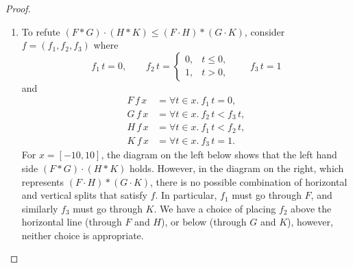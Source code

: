 \documentclass[12pt]{article}
\theoremstyle{definition}
\begin{document}
\begin{proof}
\begin{enumerate}
\item To refute $(F\ast G)\cdot (H\ast K)\le (F\cdot H)\ast (G\cdot K)$,
consider $f = (f_1, f_2, f_3)$ where
\begin{equation*}
  f_1\, t  =  0,\qquad
  f_2\, t  = 
  \begin{cases}
    0,& t\le 0,\\
    1,& t >0,
  \end{cases}
  \qquad
  f_3\, t  =  1 
\end{equation*}
and
\begin{align*}
  F\, f\, x  &=  \forall t \in x.\ f_1\, t = 0, \\
  G\, f\, x  &= \forall t \in x.\ f_2\, t < f_3\, t, \\
  H\, f\, x &=  \forall t \in x.\ f_1\, t < f_2\, t, \\
  K\, f\, x  &=  \forall t \in x.\ f_3\, t = 1. 
\end{align*}
For $x = [-10, 10]$, the diagram on the left below shows that the left
hand side $(F\ast G)\cdot (H\ast K)$ holds. However, in the diagram on
the right, which represents $(F\cdot H) \ast (G\cdot K)$, there is no
possible combination of horizontal and vertical splits that satisfy
$f$. In particular, $f_1$ must go through $F$, and similarly $f_3$
must go through $K$. We have a choice of placing $f_2$ above the
horizontal line (through $F$ and $H$), or below (through $G$ and $K$),
however, neither choice is appropriate.
\begin{center}
\end{center}
\end{enumerate}
\end{proof}
\end{document}
